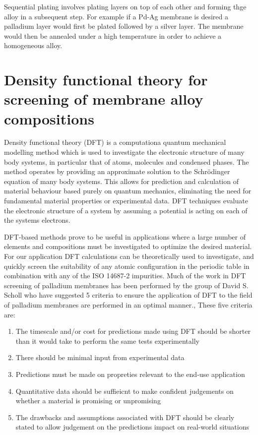 Sequential plating involves plating layers on top of each other and forming thge alloy in a subsequent step. For example if a Pd-Ag membrane is desired a palladium layer would first be plated followed by a silver layer. \cite{Exter2015} The membrane would then be annealed under a high temperature in order to achieve a homogeneous alloy. 

\section{Density functional theory for screening of membrane alloy compositions}

Density functional theory (DFT) is a computationa quantum mechanical modelling method which is used to investigate the electronic structure of many body systems, in particular that of atoms, molecules and condensed phases. The method operates by providing an approximate solution to the Schrödinger equation of many body systems. This allows for prediction and calculation of material behaviour based purely on quantum mechanics, eliminating the need for fundamental material properties or experimental data. DFT techniques evaluate the electronic structure of a system by assuming a potential is acting on each of the systems electrons. 

DFT-based methods prove to be useful in applications where a large number of elements and compositions must be investigated to optimize the desired material. For our application DFT calculations can be theoretically used to investigate, and quickly screen the suitability of any atomic configuration in the periodic table in combination with any of the ISO 14687-2 impurities. Much of the work in DFT screening of palladium membranes has been performed by the group of David S. Scholl who have suggested 5 criteria to ensure the application of DFT to the field of palladium membranes are performed in an optimal manner.\cite{SHOLL2007462}, \cite{doi:10.1021/ar500018b} These five criteria are:

\begin{enumerate}
    \item The timescale and/or cost for predictions made using DFT should be shorter than it would take to perform the same tests experimentally
    \item There should be minimal input from experimental data
    \item Predictions must be made on propreties relevant to the end-use application
    \item Quantitative data should be suffieicnt to make confident judgements on whether a material is promising or unpromising
    \item The drawbacks and assumptions associated with DFT should be clearly stated to allow judgement on the predictions impact on real-world situations
\end{enumerate}

